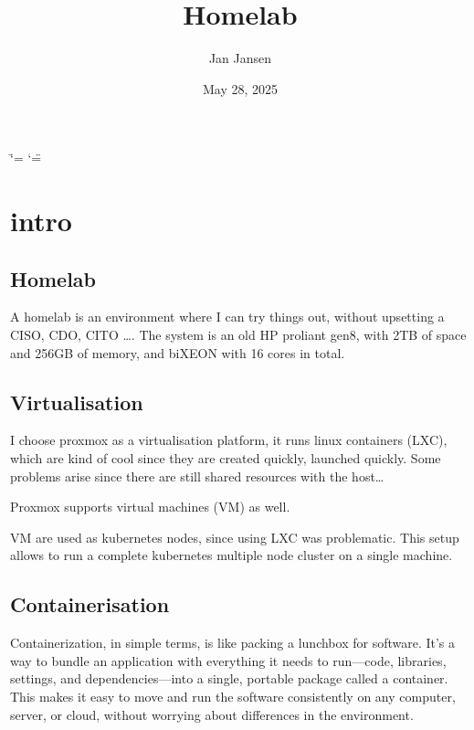 \documentclass[letterpaper,10pt,english]{sphinxmanual}
\title{Homelab}
\date{May 28, 2025}
\author{Jan Jansen}
\begin{document}
\ifdefined\shorthandoff
  \ifnum\catcode`\=\string=\active\shorthandoff{=}\fi
  \ifnum\catcode`\"=\active{}\fi
\fi

\pagestyle{empty}
\sphinxmaketitle
\pagestyle{plain}
\sphinxtableofcontents
\pagestyle{normal}
\label{\detokenize{index::doc}}


\sphinxstepscope


\chapter{intro}
\label{\detokenize{intro:intro}}\label{\detokenize{intro::doc}}

\section{Homelab}
\label{\detokenize{intro:homelab}}
\sphinxAtStartPar
A homelab is an environment where I can try things out, without upsetting a CISO, CDO, CITO ….
The system is an old HP proliant gen8, with 2TB of space and 256GB of memory, and bi\sphinxhyphen{}XEON with 16 cores in total.


\section{Virtualisation}
\label{\detokenize{intro:virtualisation}}
\sphinxAtStartPar
I choose proxmox as a virtualisation platform, it runs linux containers (LXC), which are kind of cool since they are created quickly, launched quickly. Some problems arise since there are still shared resources with the host…

\sphinxAtStartPar
Proxmox supports virtual machines (VM) as well.

\sphinxAtStartPar
VM are used as kubernetes nodes, since using LXC was problematic.
This setup allows to run a complete kubernetes multiple node cluster on a single machine.


\section{Containerisation}
\label{\detokenize{intro:containerisation}}
\sphinxAtStartPar
Containerization, in simple terms, is like packing a lunchbox for software. It’s a way to bundle an application with everything it needs to run—code, libraries, settings, and dependencies—into a single, portable package called a container. This makes it easy to move and run the software consistently on any computer, server, or cloud, without worrying about differences in the environment.
\end{document}
